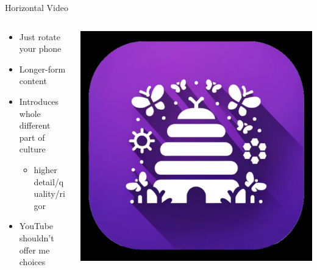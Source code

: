 \documentclass[aspectratio=169]{beamer}
\begin{document}
\begin{frame}{Horizontal Video}
\begin{columns}[T]
    \begin{column}[T]{0.5\textwidth}
        \begin{itemize}
            \item Just rotate your phone
                \item Longer-form content
                \item Introduces whole different part of culture
                \begin{itemize}
                    \item higher detail/quality/rigor
                \end{itemize}
            \item YouTube shouldn't offer me choices
        \end{itemize}
    \end{column}
    \begin{column}{0.5\textwidth}
        \includegraphics[height=0.8\textheight]{imgs/app_icons/2.png}
    \end{column}
\end{columns}
\end{frame}
\end{document}
